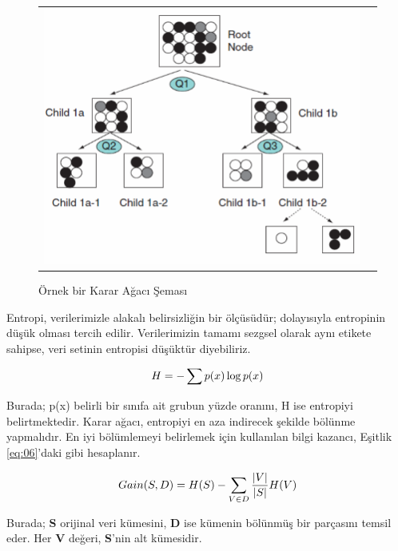 \documentclass[conference]{IEEEtran}
\begin{document}
\begin{figure}[!h]
	\centering%
	\begin{center}
		\begin{tabular}{cc}%
			\includegraphics[scale=0.4]{pictures/pic_05.png}&%
		\end{tabular}%
	\end{center}
	\caption{Örnek bir Karar Ağacı Şeması\cite{17}}%
	\label{fig:05}
\end{figure}

\quad Entropi, verilerimizle alakalı belirsizliğin bir ölçüsüdür; dolayısıyla entropinin düşük olması tercih edilir. Verilerimizin tamamı sezgsel olarak aynı etikete sahipse, veri setinin entropisi düşüktür diyebiliriz\cite{16}.

\begin{equation}
\label{eq:05}
\Large H=-\sum p(x)\log{p(x)}
\end{equation}

\quad Burada; p(x) belirli bir sınıfa ait grubun yüzde oranını, H ise entropiyi belirtmektedir. Karar ağacı, entropiyi en aza indirecek şekilde bölünme yapmalıdır. En iyi bölümlemeyi belirlemek için kullanılan bilgi kazancı, Eşitlik \ref{eq:06}'daki gibi hesaplanır\cite{16}.

\begin{equation}
\label{eq:06}
\Large Gain(S,D) = H(S)-\sum_{V\in D}^{}\frac{\left|V\right|}{\left|S\right|}H(V)
\end{equation}

\quad Burada; \textbf{S} orijinal veri kümesini, \textbf{D} ise kümenin bölünmüş bir parçasını temsil eder. Her \textbf{V} değeri, \textbf{S}'nin alt kümesidir\cite{16}.
\pagebreak
\end{document}
